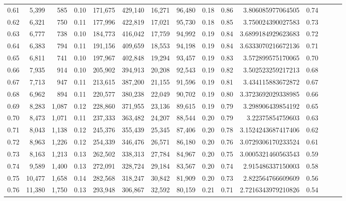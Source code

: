 \begin{tabular}{rrrrrrrrrrrrrrr}
0.61 &   5,399 &    585 &  0.10 &  171,675 &  429,140 &   16,271 &   96,480 &  0.18 &  0.86 &     3.806085977064505 &      0.74 \\
0.62 &   6,321 &    750 &  0.11 &  177,996 &  422,819 &   17,021 &   95,730 &  0.18 &  0.85 &     3.750024390027583 &      0.73 \\
0.63 &   6,777 &    738 &  0.10 &  184,773 &  416,042 &   17,759 &   94,992 &  0.19 &  0.84 &    3.6899184929623683 &      0.72 \\
0.64 &   6,383 &    794 &  0.11 &  191,156 &  409,659 &   18,553 &   94,198 &  0.19 &  0.84 &    3.6333070216672136 &      0.71 \\
0.65 &   6,811 &    741 &  0.10 &  197,967 &  402,848 &   19,294 &   93,457 &  0.19 &  0.83 &     3.572899575170065 &      0.70 \\
0.66 &   7,935 &    914 &  0.10 &  205,902 &  394,913 &   20,208 &   92,543 &  0.19 &  0.82 &     3.502523259217213 &      0.68 \\
0.67 &   7,713 &    947 &  0.11 &  213,615 &  387,200 &   21,155 &   91,596 &  0.19 &  0.81 &     3.434115883672872 &      0.67 \\
0.68 &   6,962 &    894 &  0.11 &  220,577 &  380,238 &   22,049 &   90,702 &  0.19 &  0.80 &    3.3723692029338985 &      0.66 \\
0.69 &   8,283 &  1,087 &  0.12 &  228,860 &  371,955 &   23,136 &   89,615 &  0.19 &  0.79 &     3.298906439854192 &      0.65 \\
0.70 &   8,473 &  1,071 &  0.11 &  237,333 &  363,482 &   24,207 &   88,544 &  0.20 &  0.79 &      3.22375854759603 &      0.63 \\
0.71 &   8,043 &  1,138 &  0.12 &  245,376 &  355,439 &   25,345 &   87,406 &  0.20 &  0.78 &    3.1524243687417406 &      0.62 \\
0.72 &   8,963 &  1,226 &  0.12 &  254,339 &  346,476 &   26,571 &   86,180 &  0.20 &  0.76 &    3.0729306170233524 &      0.61 \\
0.73 &   8,163 &  1,213 &  0.13 &  262,502 &  338,313 &   27,784 &   84,967 &  0.20 &  0.75 &    3.0005321460563543 &      0.59 \\
0.74 &   9,589 &  1,400 &  0.13 &  272,091 &  328,724 &   29,184 &   83,567 &  0.20 &  0.74 &     2.915486337150003 &      0.58 \\
0.75 &  10,477 &  1,658 &  0.14 &  282,568 &  318,247 &   30,842 &   81,909 &  0.20 &  0.73 &     2.822564766609609 &      0.56 \\
0.76 &  11,380 &  1,750 &  0.13 &  293,948 &  306,867 &   32,592 &   80,159 &  0.21 &  0.71 &    2.7216343979210826 &      0.54 \\

\end{tabular}
